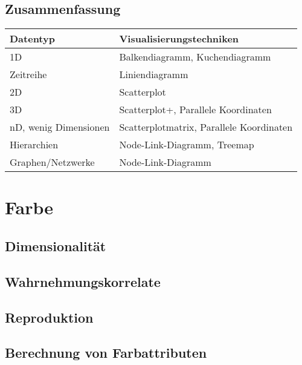 \documentclass[a4paper, 11pt, accentcolor = tud3b]{tudreport}
\begin{document}
		\section{Zusammenfassung}
			\begin{table}
				\centering
				\begin{tabular}{l|l}
					\textbf{Datentyp}     & \textbf{Visualisierungstechniken}        \\ \hline
					1D                    & Balkendiagramm, Kuchendiagramm           \\
					Zeitreihe             & Liniendiagramm                           \\
					2D                    & Scatterplot                              \\
					3D                    & Scatterplot+, Parallele Koordinaten      \\
					nD, wenig Dimensionen & Scatterplotmatrix, Parallele Koordinaten \\
					Hierarchien           & Node-Link-Diagramm, Treemap              \\
					Graphen/Netzwerke     & Node-Link-Diagramm
				\end{tabular}
			\end{table}

	\chapter{Farbe} %

		\section{Dimensionalität} %

		\section{Wahrnehmungskorrelate} %

		\section{Reproduktion} %

		\section{Berechnung von Farbattributen} %
\end{document}
